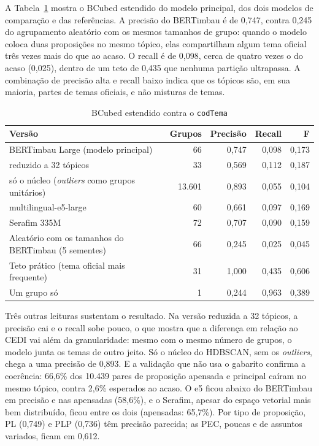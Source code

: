 A Tabela~\ref{tab:bcubed} mostra o BCubed estendido do modelo principal, dos dois modelos de comparação e das referências. A precisão do BERTimbau é de 0,747, contra 0,245 do agrupamento aleatório com os mesmos tamanhos de grupo: quando o modelo coloca duas proposições no mesmo tópico, elas compartilham algum tema oficial três vezes mais do que ao acaso. O recall é de 0,098, cerca de quatro vezes o do acaso (0,025), dentro de um teto de 0,435 que nenhuma partição ultrapassa. A combinação de precisão alta e recall baixo indica que os tópicos são, em sua maioria, partes de temas oficiais, e não misturas de temas.

\begin{table}[H]
\centering
\caption{BCubed estendido contra o \texttt{codTema}}
\label{tab:bcubed}
\small
\begin{tabularx}{\textwidth}{>{\raggedright\arraybackslash}X r r r r}
\toprule
\textbf{Versão} & \textbf{Grupos} & \textbf{Precisão} & \textbf{Recall} & \textbf{F} \\
\midrule
BERTimbau Large (modelo principal) & 66 & 0,747 & 0,098 & 0,173 \\
\quad reduzido a 32 tópicos & 33 & 0,569 & 0,112 & 0,187 \\
\quad só o núcleo (\textit{outliers} como grupos unitários) & 13.601 & 0,893 & 0,055 & 0,104 \\
multilingual-e5-large & 60 & 0,661 & 0,097 & 0,169 \\
Serafim 335M & 72 & 0,707 & 0,090 & 0,159 \\
\midrule
Aleatório com os tamanhos do BERTimbau (5 sementes) & 66 & 0,245 & 0,025 & 0,045 \\
Teto prático (tema oficial mais frequente) & 31 & 1,000 & 0,435 & 0,606 \\
Um grupo só & 1 & 0,244 & 0,963 & 0,389 \\
\bottomrule
\end{tabularx}
\end{table}

Três outras leituras sustentam o resultado. Na versão reduzida a 32 tópicos, a precisão cai e o recall sobe pouco, o que mostra que a diferença em relação ao CEDI vai além da granularidade: mesmo com o mesmo número de grupos, o modelo junta os temas de outro jeito. Só o núcleo do HDBSCAN, sem os \textit{outliers}, chega a uma precisão de 0,893. E a validação que não usa o gabarito confirma a coerência: 66,6\% dos 10.439 pares de proposição apensada e principal caíram no mesmo tópico, contra 2,6\% esperados ao acaso. O e5 ficou abaixo do BERTimbau em precisão e nas apensadas (58,6\%), e o Serafim, apesar do espaço vetorial mais bem distribuído, ficou entre os dois (apensadas: 65,7\%). Por tipo de proposição, PL (0,749) e PLP (0,736) têm precisão parecida; as PEC, poucas e de assuntos variados, ficam em 0,612.

